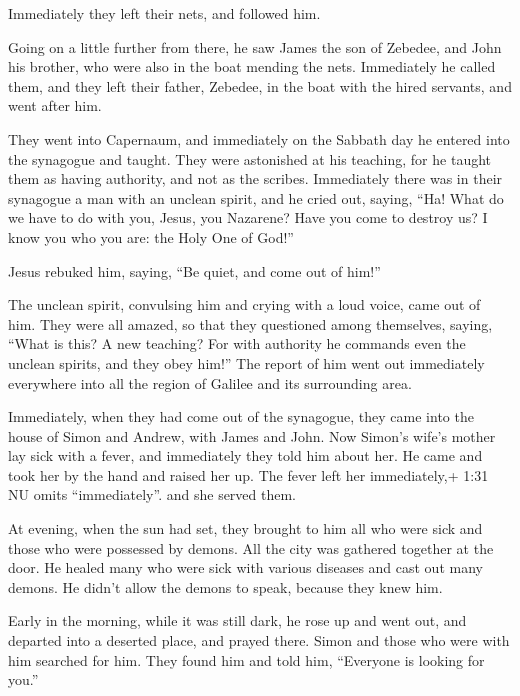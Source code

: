  Immediately they left their nets, and followed him.

 Going on a little further from there, he saw James the son
of Zebedee, and John his brother, who were also in the boat mending the
nets.  Immediately he called them, and they left their
father, Zebedee, in the boat with the hired servants, and went after
him.

 They went into Capernaum, and immediately on the Sabbath
day he entered into the synagogue and taught.  They were
astonished at his teaching, for he taught them as having authority, and
not as the scribes.  Immediately there was in their
synagogue a man with an unclean spirit, and he cried out, 
saying, ``Ha! What do we have to do with you, Jesus, you Nazarene? Have
you come to destroy us? I know you who you are: the Holy One of God!''

 Jesus rebuked him, saying, ``Be quiet, and come out of
him!''

 The unclean spirit, convulsing him and crying with a loud
voice, came out of him.  They were all amazed, so that they
questioned among themselves, saying, ``What is this? A new teaching? For
with authority he commands even the unclean spirits, and they obey
him!''  The report of him went out immediately everywhere
into all the region of Galilee and its surrounding area.

 Immediately, when they had come out of the synagogue, they
came into the house of Simon and Andrew, with James and John.
 Now Simon's wife's mother lay sick with a fever, and
immediately they told him about her.  He came and took her
by the hand and raised her up. The fever left her immediately,+ 1:31 NU
omits ``immediately''. and she served them.

 At evening, when the sun had set, they brought to him all
who were sick and those who were possessed by demons.  All
the city was gathered together at the door.  He healed many
who were sick with various diseases and cast out many demons. He didn't
allow the demons to speak, because they knew him.

 Early in the morning, while it was still dark, he rose up
and went out, and departed into a deserted place, and prayed there.
 Simon and those who were with him searched for him.
 They found him and told him, ``Everyone is looking for
you.''

